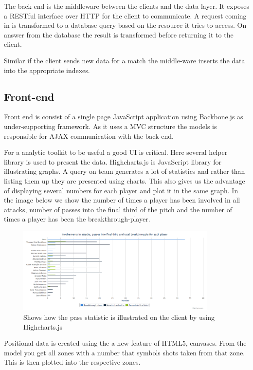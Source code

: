 The back end is the middleware between the clients and the data layer. It exposes a RESTful interface over HTTP for the client to communicate. A request coming in is transformed to a database query based on the resource it tries to access. On answer from the database the result is transformed before returning it to the client. 

Similar if the client sends new data for a match the middle-ware inserts the data into the appropriate indexes.


\subsection{Front-end}

Front end is consist of a single page JavaScript application using Backbone.js as under-supporting framework. As it uses a MVC structure the models is responsible for AJAX communication with the back-end. 

For a analytic toolkit to be useful a good UI is critical. Here several helper library is used to present the data. Highcharts.js is JavaScript library for illustrating graphs. A query on team generates a lot of statistics and rather than listing them up they are presented using charts. This also gives us the advantage of displaying several numbers for each player and plot it in the same graph. In the image below we show the number of times a player has been involved in all attacks, number of passes into the final third of the pitch and the number of times a player has been the breakthrough-player.

\begin{figure}[ht!]
\centering
\includegraphics[width=100mm]{images/general/chart_passes.png}
\caption{Shows how the pass statistic is illustrated on the client by using Highcharts.js}
\label{overflow}
\end{figure}


Positional data is created using the a new feature of HTML5, canvases. From the model you get all zones with a number that symbols shots taken from that zone. This is then plotted into the respective zones. 

